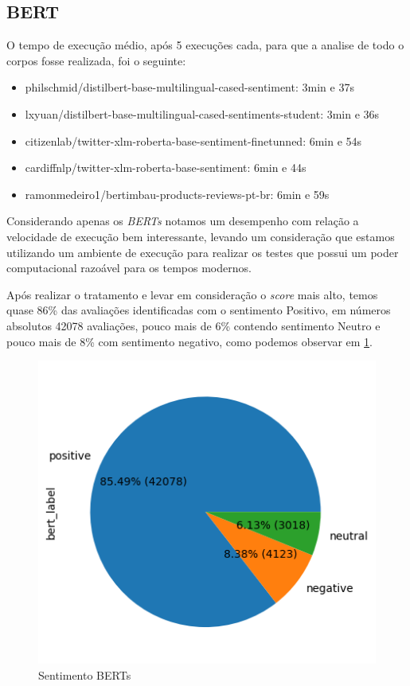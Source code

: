 \subsection[BERT]{BERT}
\label{sec:resultados:subsec:bert}

O tempo de execução médio, após 5 execuções cada, para que a analise de todo o corpos fosse realizada, foi o seguinte:

\begin{itemize}
	\item philschmid/distilbert-base-multilingual-cased-sentiment: 3min e 37s
	\item lxyuan/distilbert-base-multilingual-cased-sentiments-student: 3min e 36s
	\item citizenlab/twitter-xlm-roberta-base-sentiment-finetunned: 6min e 54s
	\item cardiffnlp/twitter-xlm-roberta-base-sentiment: 6min e 44s
	\item ramonmedeiro1/bertimbau-products-reviews-pt-br: 6min e 59s
\end{itemize}

Considerando apenas os \textit{BERTs} notamos um desempenho com relação a velocidade de execução bem interessante, levando um consideração que estamos utilizando um ambiente de execução para realizar os testes que possui um poder computacional razoável para os tempos modernos.

Após realizar o tratamento e levar em consideração o \textit{score} mais alto, temos quase 86\% das avaliações identificadas com o sentimento Positivo, em números absolutos 42078 avaliações, pouco mais de 6\% contendo sentimento Neutro e pouco mais de 8\% com sentimento negativo, como podemos observar em \ref{img:sentimento_bert}.

\begin{figure}
	\centering
	\includegraphics[width=.7\textwidth]{figs/bert/classificacao.png}
	\caption{Sentimento BERTs}
	\label{img:sentimento_bert}
\end{figure}

